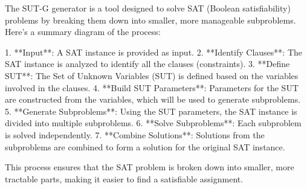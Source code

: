 The SUT-G generator is a tool designed to solve SAT (Boolean satisfiability) problems by breaking them down into smaller, more manageable subproblems. Here's a summary diagram of the process:

1. **Input**: A SAT instance is provided as input.
2. **Identify Clauses**: The SAT instance is analyzed to identify all the clauses (constraints).
3. **Define SUT**: The Set of Unknown Variables (SUT) is defined based on the variables involved in the clauses.
4. **Build SUT Parameters**: Parameters for the SUT are constructed from the variables, which will be used to generate subproblems.
5. **Generate Subproblems**: Using the SUT parameters, the SAT instance is divided into multiple subproblems.
6. **Solve Subproblems**: Each subproblem is solved independently.
7. **Combine Solutions**: Solutions from the subproblems are combined to form a solution for the original SAT instance.

This process ensures that the SAT problem is broken down into smaller, more tractable parts, making it easier to find a satisfiable assignment.